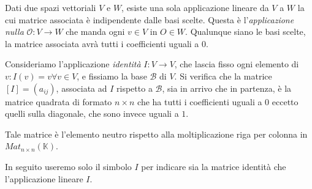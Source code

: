 \begin{observation}
	Dati due spazi vettoriali $V$ e $W$, esiste una sola applicazione
	lineare da $V$ a $W$ la cui matrice associata \`e indipendente dalle
	basi scelte. Questa \`e l'\emph{applicazione nulla}
	$\mathcal{O} : V \rightarrow W$ che manda ogni $v \in V$ in $O \in W$.
	Qualunque siano le basi scelte, la matrice associata avr\`a tutti
	i coefficienti uguali a $0$.
\end{observation}

\begin{observation}
	Consideriamo l'applicazione \emph{identit\`a} $I : V \rightarrow V$,
	che lascia fisso ogni elemento di $v: I(v) = v \forall v \in V$, e
	fissiamo la base $\mathcal{B}$ di $V$. Si verifica che la matrice
	$[I] = (a_{ij})$, associata ad $I$ rispetto a $\mathcal{B}$, sia in
	arrivo che in partenza, \`e la matrice quadrata di formato $n \times n$
	che ha tutti i coefficienti uguali a $0$ eccetto quelli sulla
	diagonale, che sono invece uguali a $1$.

	Tale matrice \`e l'elemento neutro rispetto alla moltiplicazione riga
	per colonna in $Mat_{n \times n}(\mathbb{K})$.

	In seguito useremo solo il simbolo $I$ per indicare sia la matrice identit\`a
	che	l'applicazione lineare $I$.
\end{observation}